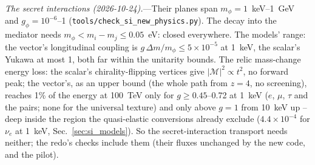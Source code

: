 \documentclass[11pt,a4paper]{article}
\newcommand{\file}[1]{\nolinkurl{#1}}
\begin{document}
\textit{The secret interactions (2026-10-24).}---Their planes span $m_\phi = 1$~keV--1~GeV and $g_\phi = 10^{-6}$--1
(\file{tools/check\_si\_new\_physics.py}). The decay into the mediator needs $m_\phi < m_i - m_j \le 0.05$~eV: closed
everywhere. The models' range: the vector's longitudinal coupling is $g\,\Delta m/m_\phi \le 5\times10^{-5}$ at 1~keV,
the scalar's Yukawa at most 1, both far within the unitarity bounds. The relic mass-change energy loss: the scalar's
chirality-flipping vertices give $|\mathcal{M}|^2 \propto t^2$, no forward peak; the vector's, as an upper bound (the
whole path from $z = 4$, no screening), reaches 1\% of the energy at 100~TeV only for $g \ge 0.45$--0.72 at 1~keV
($e$, $\mu$, $\tau$ and the pairs; none for the universal texture) and only above $g = 1$ from 10~keV up -- deep
inside the region the quasi-elastic conversions already exclude ($4.4\times10^{-4}$ for $\nu_e$ at 1~keV,
Sec.~\ref{sec:si_models}). So the secret-interaction transport needs neither; the redo's checks include them (their
fluxes unchanged by the new code, and the pilot).
\end{document}
